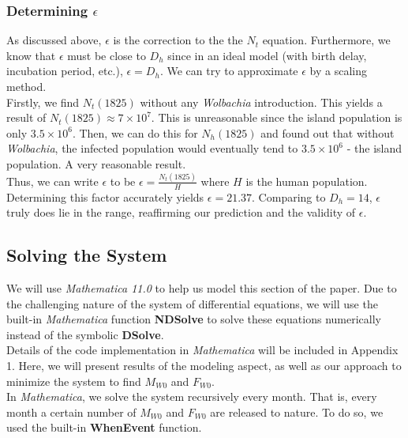 \documentclass{article}
\begin{document}
\subsubsection{Determining $\epsilon$}
As discussed above, $\epsilon$ is the correction to the the $N_t$ equation. Furthermore, we know that $\epsilon$ must be close to $D_h$ since in an ideal model (with birth delay, incubation period, etc.), $\epsilon = D_h$. We can try to approximate $\epsilon$ by a scaling method.\\

Firstly, we find $N_t(1825)$ without any \textit{Wolbachia} introduction. This yields a result of $N_t(1825)\approx7\times10^7$. This is unreasonable since the island population is only $3.5\times10^6$. Then, we can do this for $N_h(1825)$ and found out that without \textit{Wolbachia}, the infected population would eventually tend to $3.5\times10^6$ - the island population. A very reasonable result.\\

Thus, we can write $\epsilon$ to be $\epsilon=\frac{N_t(1825)}{H}$ where $H$ is the human population. Determining this factor accurately yields $\epsilon=21.37$. Comparing to $D_h=14$, $\epsilon$ truly does lie in the range, reaffirming our prediction and the validity of $\epsilon$.

\subsection{Solving the System}
We will use \textit{Mathematica 11.0} to help us model this section of the paper. Due to the challenging nature of the system of differential equations, we will use the built-in \textit{Mathematica} function \textbf{NDSolve} to solve these equations numerically instead of the symbolic \textbf{DSolve}. \\

Details of the code implementation in \textit{Mathematica} will be included in Appendix 1. Here, we will present results of the modeling aspect, as well as our approach to minimize the system to find $M_{W0}$ and $F_{W0}$. \\

In \textit{Mathematica}, we solve the system recursively every month. That is, every month a certain number of $M_{W0}$ and $F_{W0}$ are released to nature. To do so, we used the built-in \textbf{WhenEvent} function. \\
\end{document}
